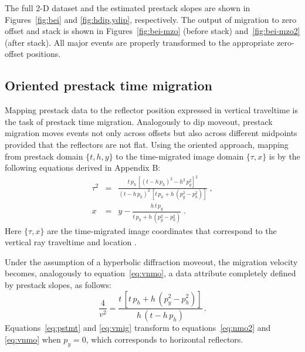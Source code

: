 
The full 2-D dataset and the estimated prestack slopes are shown in
Figures~\ref{fig:bei} and \ref{fig:hdip,ydip}, respectively. The
output of migration to zero offset and stack is shown in
Figures~\ref{fig:bei-mzo} (before stack) and~\ref{fig:bei-mzo2} (after
stack). All major events are properly transformed to the appropriate
zero-offset positions.



\subsection{Oriented prestack time migration}

Mapping prestack data to the reflector position expressed in vertical
traveltime is the task of prestack time migration. %
Analogously to dip moveout, prestack migration moves events not only
across offsets %
but also across different midpoints provided that the reflectors are
not flat. Using the oriented approach, mapping from  prestack
domain $\{t,h,y\}$ to the time-migrated image domain $\{\tau,x\}$ is
  by the following equations derived in Appendix B:
\begin{eqnarray}
  \label{eq:pstmt}
  \tau^2 & = & 
  \frac{t\,p_h\,\left[(t-h\,p_h)^2 - h^2\,p_y^2\right]^2}
  {(t-h\,p_h)^2\,\left[t\,p_h + h\,(p_y^2-p_h^2)\right]}\;, \\
  \label{eq:pstmx}  
  x & = & y - \frac{h\,t\,p_y}{t\,p_h + h\,(p_y^2-p_h^2)}\;.
\end{eqnarray}
Here $\{\tau,x\}$ are the time-migrated image coordinates that
correspond to the vertical ray traveltime and location
\cite[]{GPR25-04-07380745}.

Under the assumption of a hyperbolic diffraction moveout, the migration velocity
becomes, analogously to equation~\ref{eq:vnmo}, a data attribute completely
defined by prestack slopes, as follows:
\begin{equation}
  {\frac{4}{v^2}} = {\frac{t\,\left[t\,p_h + h\,(p_y^2-p_h^2)\right]}
  {h\,(t-h\,p_h)}}\,.
  \label{eq:vmig}
\end{equation}
Equations~\ref{eq:pstmt} and \ref{eq:vmig} transform to
equations~\ref{eq:nmo2} and \ref{eq:vnmo} when $p_y=0$, which
corresponds to horizontal reflectors. 

